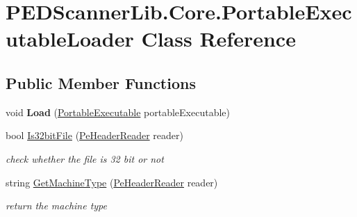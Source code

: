 \hypertarget{class_p_e_d_scanner_lib_1_1_core_1_1_portable_executable_loader}{}\section{P\+E\+D\+Scanner\+Lib.\+Core.\+Portable\+Executable\+Loader Class Reference}
\label{class_p_e_d_scanner_lib_1_1_core_1_1_portable_executable_loader}
\subsection*{Public Member Functions}
\begin{DoxyCompactItemize}
\item 
\mbox{\label{class_p_e_d_scanner_lib_1_1_core_1_1_portable_executable_loader_af369b1ed2a8b0f76c21c5ee522f4ab47}} 
void {\bfseries Load} (\mbox{\hyperlink{class_p_e_d_scanner_lib_1_1_core_1_1_portable_executable}{Portable\+Executable}} portable\+Executable)
\item 
bool \mbox{\hyperlink{class_p_e_d_scanner_lib_1_1_core_1_1_portable_executable_loader_ab40516998ff72efd721effcb1cc858e3}{Is32bit\+File}} (\mbox{\hyperlink{class_p_e_d_scanner_lib_1_1_struct_1_1_pe_header_reader}{Pe\+Header\+Reader}} reader)
\begin{DoxyCompactList}\small\item\em check whether the file is 32 bit or not \end{DoxyCompactList}\item 
string \mbox{\hyperlink{class_p_e_d_scanner_lib_1_1_core_1_1_portable_executable_loader_aa558ac645b1c1d45d6ca2de6f11254e2}{Get\+Machine\+Type}} (\mbox{\hyperlink{class_p_e_d_scanner_lib_1_1_struct_1_1_pe_header_reader}{Pe\+Header\+Reader}} reader)
\begin{DoxyCompactList}\small\item\em return the machine type \end{DoxyCompactList}\end{DoxyCompactItemize}
